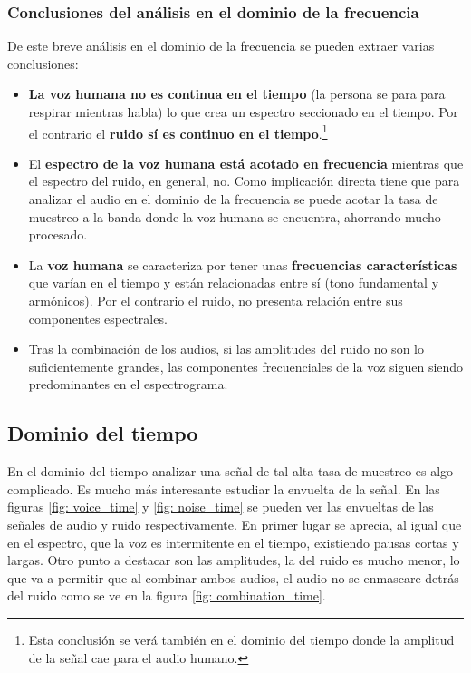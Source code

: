 \subsubsection{Conclusiones del análisis en el dominio de la frecuencia}
De este breve análisis en el dominio de la frecuencia se pueden extraer varias conclusiones:
\begin{itemize}
	\item \textbf{La voz humana no es continua en el tiempo} (la persona se para para respirar mientras habla) lo que crea un espectro seccionado en el tiempo. Por el contrario el \textbf{ruido sí es continuo en el tiempo}.\footnote{Esta conclusión se verá también en el dominio del tiempo donde la amplitud de la señal cae para el audio humano.}
	\item El \textbf{espectro de la voz humana está acotado en frecuencia} mientras que el espectro del ruido, en general, no. Como implicación directa tiene que para analizar el audio en el dominio de la frecuencia se puede acotar la tasa de muestreo a la banda donde la voz humana se encuentra, ahorrando mucho procesado.
	\item La \textbf{voz humana} se caracteriza por tener unas \textbf{frecuencias características} que varían en el tiempo y están relacionadas entre sí (tono fundamental y armónicos). Por el contrario el ruido, no presenta relación entre sus componentes espectrales.
	\item Tras la combinación de los audios, si las amplitudes del ruido no son lo suficientemente grandes, las componentes frecuenciales de la voz siguen siendo predominantes en el espectrograma.
\end{itemize}

\subsection{Dominio del tiempo}
En el dominio del tiempo analizar una señal de tal alta tasa de muestreo es algo complicado. Es mucho más interesante estudiar la envuelta de la señal. En las figuras \ref{fig: voice_time} y \ref{fig: noise_time} se pueden ver las envueltas de las señales de audio y ruido respectivamente. En primer lugar se aprecia, al igual que en el espectro, que la voz es intermitente en el tiempo, existiendo pausas cortas y largas. Otro punto a destacar son las amplitudes, la del ruido es mucho menor, lo que va a permitir que al combinar ambos audios, el audio no se enmascare detrás del ruido como se ve en la figura \ref{fig: combination_time}.

